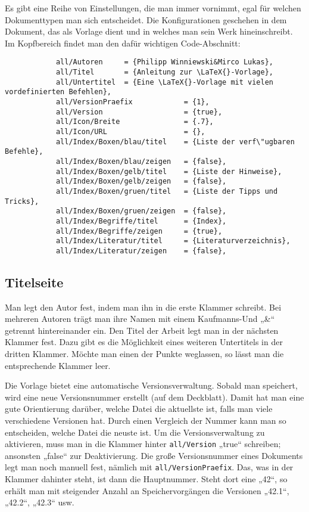 			Es gibt eine Reihe von Einstellungen, die man immer vornimmt, egal für welchen Dokumenttypen man sich entscheidet. Die Konfigurationen geschehen in dem Dokument, das als Vorlage dient und in welches man sein Werk hineinschreibt. Im Kopfbereich findet man den dafür wichtigen Code-Abschnitt: 
			
			\begin{verbatim}
			all/Autoren     = {Philipp Winniewski&Mirco Lukas},
			all/Titel       = {Anleitung zur \LaTeX{}-Vorlage},
			all/Untertitel  = {Eine \LaTeX{}-Vorlage mit vielen vordefinierten Befehlen},
			all/VersionPraefix            = {1},
			all/Version                   = {true},
			all/Icon/Breite               = {.7},
			all/Icon/URL                  = {},
			all/Index/Boxen/blau/titel    = {Liste der verf\"ugbaren Befehle},
			all/Index/Boxen/blau/zeigen   = {false},
			all/Index/Boxen/gelb/titel    = {Liste der Hinweise},
			all/Index/Boxen/gelb/zeigen   = {false},
			all/Index/Boxen/gruen/titel   = {Liste der Tipps und Tricks},
			all/Index/Boxen/gruen/zeigen  = {false},
			all/Index/Begriffe/titel      = {Index},
			all/Index/Begriffe/zeigen     = {true},
			all/Index/Literatur/titel     = {Literaturverzeichnis},
			all/Index/Literatur/zeigen    = {false},
			\end{verbatim}
		
			\subsection{Titelseite}
			
				Man legt den Autor fest, indem man ihn in die erste Klammer schreibt. Bei mehreren Autoren trägt man ihre Namen mit einem Kaufmanns-Und „\&“ getrennt hintereinander ein. Den Titel der Arbeit legt man in der nächsten Klammer fest. Dazu gibt es die Möglichkeit eines weiteren Untertitels in der dritten Klammer. Möchte man einen der Punkte weglassen, so lässt man die entsprechende Klammer leer. 
				
				Die Vorlage bietet eine automatische Versionsverwaltung. Sobald man speichert, wird eine neue Versionsnummer erstellt (auf dem Deckblatt). Damit hat man eine gute Orientierung darüber, welche Datei die aktuellste ist, falls man viele verschiedene Versionen hat. Durch einen Vergleich der Nummer kann man so entscheiden, welche Datei die neuste ist. Um die Versionsverwaltung zu aktivieren, muss man in die Klammer hinter \texttt{all/Version} „true“ schreiben; ansonsten „false“ zur Deaktivierung. Die große Versionsnummer eines Dokuments legt man noch manuell fest, nämlich mit \texttt{all/VersionPraefix}. Das, was in der Klammer dahinter steht, ist dann die Hauptnummer. Steht dort eine „42“, so erhält man mit steigender Anzahl an Speichervorgängen die Versionen „42.1“, „42.2“, „42.3“ usw.
				
